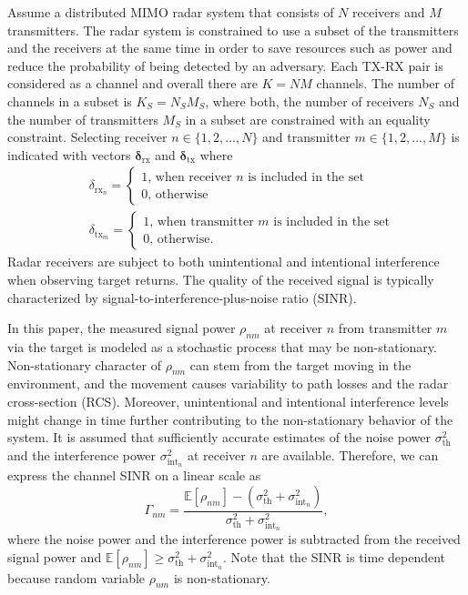 \documentclass[conference]{IEEEtran}
\newcommand{\thnoise}{\sigma^2_{\text{th}}}
\newcommand{\eintnoise}{\sigma^2_{\text{int}_{n}}}
\newcommand{\esinrexp}{\Gamma_{nm}}
\newcommand{\E}[1]{\mathbb{E}\left[ #1 \right]}
\newcommand{\easvtx}{\delta_{\text{tx}_m}}
\newcommand{\vasvtx}{\boldsymbol{\delta}_{\text{tx}}}
\newcommand{\easvrx}{\delta_{\text{rx}_n}}
\newcommand{\vasvrx}{\boldsymbol{\delta}_{\text{rx}}}
\newcommand{\esp}{\rho_{nm}}
\begin{document}
Assume a distributed MIMO radar system that consists of $N$ receivers and $M$ transmitters.
The radar system is constrained to use a subset of the transmitters and the receivers at the same time in order to save resources such as power and reduce the probability of being detected by an adversary.
Each TX-RX pair is considered as a channel and overall there are $K=NM$ channels.
The number of channels in a subset is $K_S = N_S M_S$, where both, the number of receivers $N_S$ and the number of transmitters $M_S$ in a subset are constrained with an equality constraint.
Selecting receiver $n \in \{1, 2, ..., N\}$ and transmitter $m \in \{1,2, ..., M\}$ is indicated with vectors $\vasvrx$ and $\vasvtx$ where
\begin{align}
    &\easvrx = 
    \left\{\begin{array}{l}
        1 \text{, when receiver $n$ is included in the set} \\
        0 \text{, otherwise}
    \end{array}\right.\\
    &\easvtx = 
    \left\{\begin{array}{l}
        1 \text{, when transmitter $m$ is included in the set} \\
        0 \text{, otherwise.}
    \end{array}\right.
\end{align}
Radar receivers are subject to both unintentional and intentional interference when observing target returns.
The quality of the received signal is typically characterized by signal-to-interference-plus-noise ratio (SINR).

In this paper, the measured signal power $\esp$ at receiver $n$ from transmitter $m$ via the target is modeled as a stochastic process that may be non-stationary. 
Non-stationary character of $\esp$ can stem from the target moving in the environment, and 
the movement causes variability to path losses and the radar cross-section (RCS).
Moreover, unintentional and intentional interference levels might change in time further contributing to the non-stationary behavior of the system.
It is assumed that sufficiently accurate estimates of the noise power $\thnoise$ and the interference power $\eintnoise$ at receiver $n$ are available.
Therefore, we can express the channel SINR on a linear scale as
\begin{equation}\label{eq:sinr}
     \esinrexp = \frac{\E{\esp}- (\thnoise + \eintnoise)}{\thnoise + \eintnoise },
\end{equation}
where the noise power and the interference power is subtracted from the received signal power and $\E{\esp} \geq \thnoise + \eintnoise$.
Note that the SINR is time dependent because random variable $\esp$ is non-stationary. 
\end{document}
